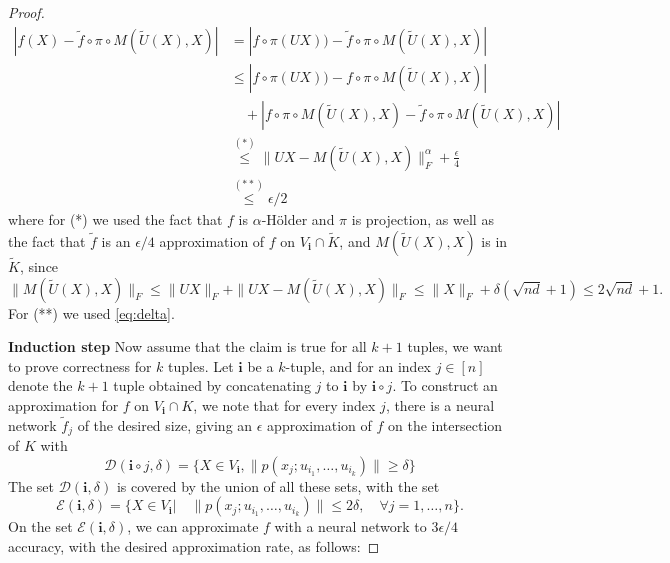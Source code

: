 \documentclass[twoside,11pt]{article}
\begin{document}
\begin{proof}
\begin{align*}
|f(X)-\tilde f\circ \pi \circ M\left(\tilde{U}(X), X \right) |&=|f\circ \pi(UX))-\tilde f\circ \pi \circ M\left(\tilde{U}(X), X \right) |\\
&\leq |f\circ \pi(UX))- f\circ \pi  \circ M\left(\tilde{U}(X), X \right)|\\
&\quad +| f\circ \pi  \circ M\left(\tilde{U}(X), X \right)-\tilde f\circ \pi  \circ M\left(\tilde{U}(X), X \right)|\\
&\stackrel{(*)}{\leq} \|UX-M(\tilde{U}(X),X)\|_F^\alpha+\frac{\epsilon}{4}\\
&\stackrel{(**)}{\leq} \epsilon/2
\end{align*}
where for (*) we used the fact that  $f$ is $\alpha$-H\"older and $\pi$ is projection, as well as the fact that $\tilde f $ is an $\epsilon/4$ approximation of $f$ on $V_{\mathbf{i}}\cap \tilde{K}$, and  $M(\tilde U(X),X)$ is in $\tilde K $, since
$$\|M(\tilde U(X),X)\|_F\leq \|UX\|_F+\|UX-M(\tilde U(X),X)\|_F\leq \|X\|_F+\delta(\sqrt{nd}+1)\leq 2\sqrt {nd}+1.$$
For (**) we used \eqref{eq:delta}.

\textbf{Induction step} Now assume that the claim is true for all $k+1$ tuples, we want to prove correctness for $k$ tuples. Let $\mathbf{i}$ be a $k$-tuple, and for an index $j\in [n]$ denote the $k+1$ tuple obtained by concatenating $j$ to $\mathbf{i}$ by $\mathbf{i}\circ j $. To construct an approximation for $f$ on $V_{\mathbf{i}}\cap K $, we note that for every index $j$, there is a neural network $\tilde f_j$ of the desired size, giving an $\epsilon$ approximation of $f$ on the intersection of $K$ with
$$\mathcal{D}(\mathbf{i}\circ j,\delta)=\{X\in V_{\mathbf{i}}, \|p(x_j;u_{i_1},\ldots,u_{i_{k}})\|\geq \delta  \} $$
The set $\mathcal{D}(\mathbf{i},\delta)$ is covered by the union of all these sets,  with the set 
$$\mathcal{E}(\mathbf{i},\delta)=\{X\in V_{\mathbf{i}}| \quad \|p(x_j;u_{i_1},\ldots,u_{i_{k}})\|\leq 2\delta, \quad \forall j=1,\ldots,n  \} .$$
On the set $\mathcal{E}(\mathbf{i},\delta)$, we can approximate $f$ with a neural network to $3\epsilon/4$ accuracy, with the desired approximation rate, as follows:


\end{proof}
\end{document}
